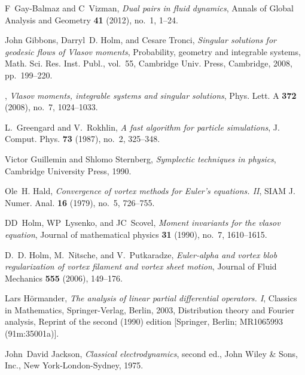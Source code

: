 \documentclass[12pt]{amsart}
\theoremstyle{remark}
\begin{document}
\begin{thebibliography}{FDMM91}
F~Gay-Balmaz and C~Vizman, \emph{Dual pairs in fluid dynamics}, Annals of
  Global Analysis and Geometry \textbf{41} (2012), no.~1, 1--24.

John Gibbons, Darryl~D. Holm, and Cesare Tronci, \emph{Singular solutions for
  geodesic flows of {V}lasov moments}, Probability, geometry and integrable
  systems, Math. Sci. Res. Inst. Publ., vol.~55, Cambridge Univ. Press,
  Cambridge, 2008, pp.~199--220. 

\bysame, \emph{Vlasov moments, integrable systems and singular solutions},
  Phys. Lett. A \textbf{372} (2008), no.~7, 1024--1033. 

L.~Greengard and V.~Rokhlin, \emph{A fast algorithm for particle simulations},
  J. Comput. Phys. \textbf{73} (1987), no.~2, 325--348. 

Victor Guillemin and Shlomo Sternberg, \emph{Symplectic techniques in physics},
  Cambridge University Press, 1990.

Ole~H. Hald, \emph{Convergence of vortex methods for {E}uler's equations.
  {II}}, SIAM J. Numer. Anal. \textbf{16} (1979), no.~5, 726--755. 

DD~Holm, WP~Lysenko, and JC~Scovel, \emph{Moment invariants for the vlasov
  equation}, Journal of mathematical physics \textbf{31} (1990), no.~7,
  1610--1615.

D.~D. {Holm}, M.~{Nitsche}, and V.~{Putkaradze}, \emph{{Euler-alpha and vortex
  blob regularization of vortex filament and vortex sheet motion}}, Journal of
  Fluid Mechanics \textbf{555} (2006), 149--176.

Lars H{\"o}rmander, \emph{The analysis of linear partial differential
  operators. {I}}, Classics in Mathematics, Springer-Verlag, Berlin, 2003,
  Distribution theory and Fourier analysis, Reprint of the second (1990)
  edition [Springer, Berlin; MR1065993 (91m:35001a)]. 

John~David Jackson, \emph{Classical electrodynamics}, second ed., John Wiley \&
  Sons, Inc., New York-London-Sydney, 1975. 


\end{thebibliography}
\end{document}
